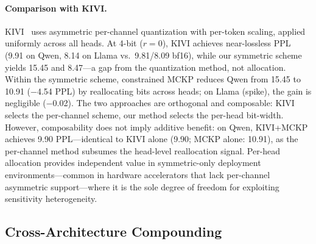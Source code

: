 \paragraph{Comparison with KIVI.}
KIVI~\cite{liu2024kivi} uses asymmetric per-channel quantization with per-token scaling, applied uniformly across all heads.
At 4-bit ($r{=}0$), KIVI achieves near-lossless PPL (9.91 on Qwen, 8.14 on Llama vs.\ 9.81/8.09 bf16), while our symmetric scheme yields 15.45 and 8.47---a gap from the quantization method, not allocation.
Within the symmetric scheme, constrained MCKP reduces Qwen from 15.45 to 10.91 ($-$4.54 PPL) by reallocating bits across heads; on Llama (spike), the gain is negligible ($-$0.02).
The two approaches are orthogonal and composable: KIVI selects the per-channel scheme, our method selects the per-head bit-width.
However, composability does not imply additive benefit: on Qwen, KIVI+MCKP achieves 9.90 PPL---identical to KIVI alone (9.90; MCKP alone: 10.91), as the per-channel method subsumes the head-level reallocation signal.
Per-head allocation provides independent value in symmetric-only deployment environments---common in hardware accelerators that lack per-channel asymmetric support---where it is the sole degree of freedom for exploiting sensitivity heterogeneity.



\subsection{Cross-Architecture Compounding}
\label{sec:compounding_cross}

